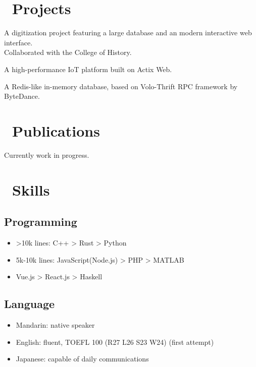 \documentclass{resume}
\begin{document}
\section{\faCode\ Projects}
A digitization project featuring a large database and an modern interactive web interface.\\
Collaborated with the College of History.

A high-performance IoT platform built on Actix Web.

A Redis-like in-memory database, based on Volo-Thrift RPC framework by ByteDance.

\section{\faBookmarkO\ Publications}
Currently work in progress.

\section{\faCogs\ Skills}
\subsection{\textbf{Programming}}
\begin{itemize}[parsep=0.5ex]
  \item >10k lines: C++ > Rust > Python
  \item 5k-10k lines: JavaScript(Node.js) > PHP > MATLAB
  \item <5k lines: Java > Vue.js > React.js > Haskell
\end{itemize}
\subsection{\textbf{Language}}
\begin{itemize}[parsep=0.5ex]
  \item Mandarin: native speaker
  \item English: fluent, TOEFL 100 (R27 L26 S23 W24) (first attempt)
  \item Japanese: capable of daily communications
\end{itemize}
\end{document}
